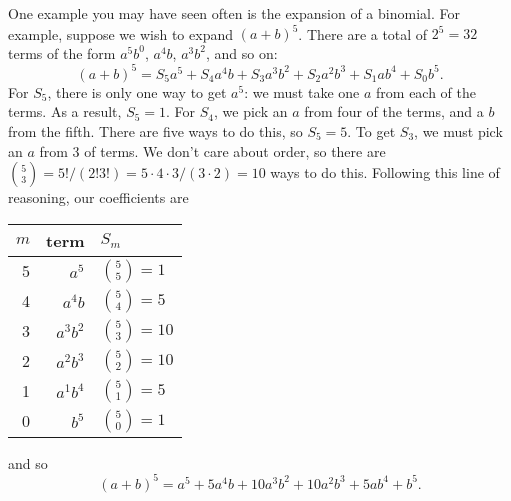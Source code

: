 One example you may have seen often is the expansion of a binomial.  For example, suppose we wish to expand $(a+b)^{5}$.  There are a total of $2^{5}=32$ terms of the form $a^{5}b^{0}$, $a^{4}b$, $a^{3}b^{2}$, and so on:
\[
	(a+b)^{5} = S_{5}a^{5}+S_{4}a^{4}b+S_{3}a^{3}b^{2}+S_{2}a^{2}b^{3}+S_{1}ab^{4}+S_{0}b^{5}.
\]
For $S_{5}$, there is only one way to get $a^{5}$: we must take one $a$ from each of the terms. As a result, $S_{5}=1$. For $S_{4}$, we pick an $a$ from four of the terms, and a $b$ from the fifth. There are five ways to do this, so $S_{5} =5$. To get $S_{3}$, we must pick an $a$ from 3 of terms.  We don't care about order, so there are ${5\choose3} = 5!/(2!3!) = 5\cdot4\cdot3/(3\cdot2)=10$ ways to do this. Following this line of reasoning, our coefficients are
\begin{center}
\begin{tabular}{rrl}
$m$ & term 			& $S_{m}$\\
\hline
5	& $a^{5}$		& ${5\choose5}=1$\\
4	& $a^{4}b$		& ${5\choose4}=5$\\
3	& $a^{3}b^{2}$	& ${5\choose3}=10$\\
2	& $a^{2}b^{3}$	& ${5\choose2}=10$\\
1	& $a^{1}b^{4}$	& ${5\choose1}=5$\\
0	& $b^{5}$		& ${5\choose0}=1$\\
\end{tabular}
\end{center}
and so
\[ (a+b)^{5} = a^{5}+5a^{4}b+10a^{3}b^{2}+10a^{2}b^{3}+5ab^{4}+b^{5}. \]


